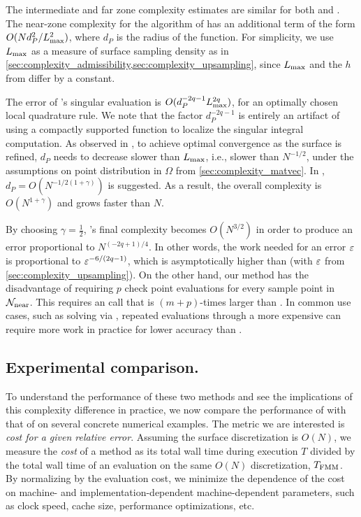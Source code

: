 The intermediate and far zone complexity estimates are similar for both \qbkix and \cite{YBZ}. 
The near-zone complexity for the algorithm of \cite{YBZ} has an additional term of the form  $O(N d_P^2/L_{\mathrm{max}}^2)$, where $d_P$ is the radius of the \pou function.
For simplicity, we use $L_{\mathrm{max}}$ as a measure of surface sampling density as in \cref{sec:complexity_admissibility,sec:complexity_upsampling}, since $L_{\mathrm{max}}$ and the $h$ from \cite{YBZ} differ by a constant.

The error of \cite{YBZ}'s singular evaluation is $O( d_P^{-2q-1}L_{\mathrm{max}}^{2q})$, for an optimally chosen local quadrature rule.
We note that the factor $d_P^{-2q-1}$ is entirely an artifact of using a compactly supported \pou function to localize the singular integral computation.
As observed in \cite{YBZ}, to achieve optimal convergence  as the surface is refined, $d_P$ needs to decrease slower than $L_{\mathrm{max}}$, i.e., slower than $N^{-1/2}$, under the assumptions on point distribution in $\Omega$ from \cref{sec:complexity_matvec}.
In \cite{YBZ}, $d_P = O(N^{-1/2(1+\gamma)})$ is suggested.
As a result, the overall complexity is $O(N^{1+\gamma})$ and grows faster than $N$. 

By choosing $\gamma = \frac{1}{2}$, \cite{YBZ}'s final complexity
becomes $O(N^{3/2})$ in order to produce an error proportional to $N^{(-2q+1)/4}$.
In other words, the work needed for an error $\varepsilon$ is proportional to $\varepsilon^{-6/(2q-1)}$, which is asymptotically higher than \qbkix (with $\varepsilon$ from \cref{sec:complexity_upsampling}). 
On the other hand, our method has the disadvantage of requiring $p$ check point evaluations for every sample point in $\mathcal{N}_{\mathrm{near}}$. 
This requires an \fmm call that is $(m+p)$-times larger than \cite{YBZ}.
In common use cases, such as solving \cite[Equation 5]{morse2020robust} via \gmres, repeated \qbkix evaluations through a more expensive \fmm can require more work in practice for lower accuracy than \cite{YBZ}.

\subsection{Experimental comparison.}

To understand the performance of these two methods and see the implications of this complexity difference in practice, we now compare the performance of \qbkix with that of \cite{YBZ} on several concrete numerical examples.
The metric we are interested is \textit{cost for a given relative error}.
Assuming the surface discretization is $O(N)$, we measure the \textit{cost} of a method as its total wall time during execution $T$ divided by the total wall time of an \fmm evaluation on the same $O(N)$ discretization, $T_{\mathrm{FMM}}$. 
By normalizing by the \fmm evaluation cost, we minimize the dependence of the cost on machine- and implementation-dependent machine-dependent parameters, such as clock speed, cache size, performance optimizations, etc.


